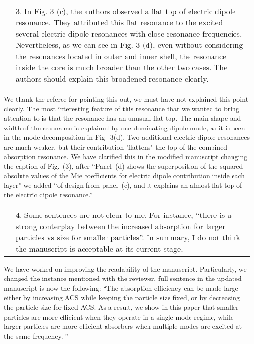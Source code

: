 \documentclass[a4paper]{article}
\begin{document}
\begin{tabular}[!H]{l|p{}}
\quad & 3.  In Fig. 3 (c), the authors observed a flat top of electric
dipole resonance. They attributed this flat resonance to the excited
several electric dipole resonances with close resonance
frequencies. Nevertheless, as we can see in Fig. 3 (d), even without
considering the resonances located in outer and inner shell, the
resonance inside the core is much broader than the other two
cases. The authors should explain this broadened resonance clearly.
\end{tabular}

We thank the referee for pointing this out, we must have not explained
this point clearly. The most interesting feature of this resonance
that we wanted to bring attention to is that the resonance has an
unusual flat top. The main shape and width of the resonance is
explained by one dominating dipole mode, as it is seen in the mode
decomposition in Fig.~3(d). Two additional electric dipole resonances
are much weaker, but their contribution "flattens" the top of the
combined absorption resonance. We have clarified this in the modified
manuscript changing the caption of Fig.~(3), after ``Panel~(d) shows
the superposition of the squared absolute values of the Mie
coefficients for electric dipole contribution inside each layer'' we
added ``of design from panel~(c), and it explains an almost
flat top of the electric dipole resonance.''


\begin{tabular}[!H]{l|p{}}
\quad & 4.  Some sentences are not clear to me. For instance, “there
is a strong conterplay between the increased absorption for larger
particles vs size for smaller particles”.  In summary, I do not think
the manuscript is acceptable at its current stage.
\end{tabular}%

We have worked on improving the readability of the
manuscript. Particularly, we changed the instance mentioned with the
reviewer, full sentence in the updated manuscript is now the
following: ``The absorption efficiency can be made large either by
increasing ACS while keeping the particle size fixed, or by decreasing
the particle size for fixed ACS. As a result, we show in this paper
that smaller particles are more efficient when they operate in a
single mode regime, while larger particles are more efficient
absorbers when multiple modes are excited at the same frequency. ''
\end{document}
